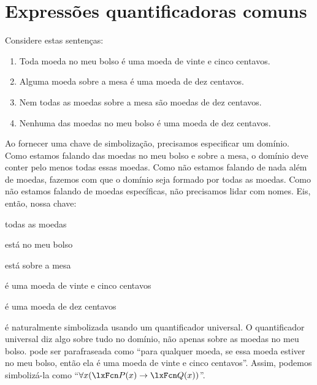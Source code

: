 

\section{Expressões quantificadoras comuns}
Considere estas sentenças:
	\begin{enumerate}
\item\label{quan1} Toda moeda no meu bolso é uma moeda de vinte e cinco centavos.
\item\label{quan2} Alguma moeda sobre a mesa é uma moeda de dez centavos.
\item\label{quan3} Nem todas as moedas sobre a mesa são moedas de dez centavos.
\item\label{quan4} Nenhuma das moedas no meu bolso é uma moeda de dez centavos.
	\end{enumerate}
Ao fornecer uma chave de simbolização, precisamos especificar um domínio. Como estamos falando das moedas no meu bolso e sobre a mesa, o domínio deve conter pelo menos todas essas moedas. Como não estamos falando de nada além de moedas, fazemos com que o domínio seja formado por todas as moedas. Como não estamos falando de moedas específicas, não precisamos lidar com nomes. Eis, então, nossa chave:
	\begin{ekey}
\item[\text{domínio}] todas as moedas
\item[\atom{P}{x}]  está no meu bolso
\item[\atom{T}{x}]  está sobre a mesa
\item[\atom{Q}{x}]  é uma moeda de vinte e cinco centavos
\item[\atom{D}{x}]  é uma moeda de dez centavos
	\end{ekey}
 é naturalmente simbolizada usando um quantificador universal. O quantificador universal diz algo sobre tudo no domínio, não apenas sobre as moedas no meu bolso.  pode ser parafraseada como \textquotedblleft para qualquer moeda, se essa moeda estiver no meu bolso, então ela é uma moeda de vinte e cinco centavos\textquotedblright{}. Assim, podemos simbolizá-la como \textquotedblleft $\forall x(\atom{P}{x} \eif \atom{Q}{x})$\textquotedblright{}.

